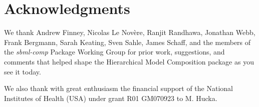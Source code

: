 
\section{Acknowledgments}

We thank Andrew Finney, Nicolas Le Nov\`{e}re, Ranjit Randhawa, Jonathan
Webb, Frank Bergmann, Sarah Keating, Sven Sahle, James Schaff, and the
members of the \emph{sbml-comp} Package Working Group for prior work,
suggestions, and comments that helped shape the Hierarchical Model
Composition package as you see it today.

We also thank with great enthusiasm the financial support of the National
Institutes of Health (USA) under grant R01 GM070923 to M. Hucka.

